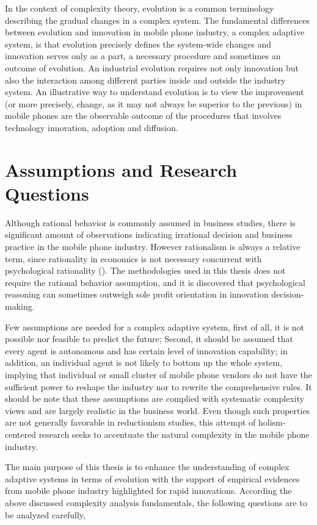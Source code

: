 \documentclass[utf8,english]{gradu3}
\begin{document}
In the context of complexity theory, evolution is a common terminology describing the gradual changes in a complex system. The fundamental differences between evolution and innovation in mobile phone industry, a complex adaptive system, is that evolution precisely defines the system-wide changes and innovation serves only as a part, a necessary procedure and sometimes an outcome of evolution. An industrial evolution requires not only innovation but also the interaction among different parties inside and outside the industry system. An illustrative way to understand evolution is to view the improvement (or more precisely, change, as it may not always be superior to the previous) in mobile phones are the observable outcome of the procedures that involves technology innovation, adoption and diffusion.

\section{Assumptions and Research Questions}

Although rational behavior is commonly assumed in business studies, there is significant amount of observations indicating irrational decision and business practice in the mobile phone industry. However rationalism is always a relative term, since rationality in economics is not necessary concurrent with psychological rationality (\cite{hogarth1987rational}). The methodologies used in this thesis does not require the rational behavior assumption, and it is discovered that psychological reasoning can sometimes outweigh sole profit orientation in innovation decision-making.

Few assumptions are needed for a complex adaptive system, first of all, it is not possible nor feasible to predict the future; Second, it should be assumed that every agent is autonomous and has certain level of innovation capability; in addition, an individual agent is not likely to bottom up the whole system, implying that individual or small cluster of mobile phone vendors do not have the sufficient power to reshape the industry nor to rewrite the comprehensive rules. It should be note that these assumptions are complied with systematic complexity views and are largely realistic in the business world. Even though such properties are not generally favorable in reductionism studies, this attempt of holism-centered research seeks to accentuate the natural complexity in the mobile phone industry.

The main purpose of this thesis is to enhance the understanding of complex adaptive systems in terms of evolution with the support of empirical evidences from mobile phone industry highlighted for rapid innovations. According the above discussed complexity analysis fundamentals, the following questions are to be analyzed carefully,
\end{document}
